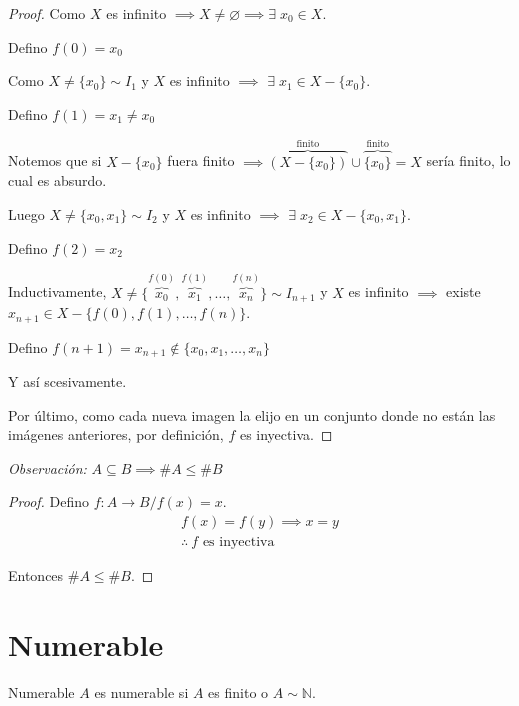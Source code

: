 \begin{proof}\phantom{.}

    Como $X$ es infinito $\implies X \neq \varnothing \implies \exists \;
    x_0 \in X$.

    Defino $f(0) = x_0$

    \medskip
    Como $X \neq \{x_0\} \sim I_1$ y $X$ es infinito $\implies$ 
    $\exists \; x_1 \in X - \{ x_0 \}$. 

    Defino $f(1) = x_1 \neq x_0$

    Notemos que si
    $X - \{ x_0 \}$ fuera finito 
    $\implies \overbrace{(X-\{x_0\})}^{\text{finito}}
    \cup \overbrace{\{ x_0 \}}^{\text{finito}} = X $ sería finito, lo cual
    es absurdo.

    \medskip

    Luego $X \neq \{x_0, x_1\} \sim I_2$ y $X$ es infinito $\implies$ 
    $\exists \; x_2 \in X - \{x_0, x_1\}$. 

    Defino $f(2) = x_2$

    Inductivamente,
    $X \neq \{\overbrace{x_0}^{f(0)}, \overbrace{x_1}^{f(1)}, \dotsc, 
    \overbrace{x_n}^{f(n)}\} 
    \sim I_{n+1}$ y $X$ es infinito $\implies$ existe 
    $x_{n+1} \in X - \{f(0), f(1), \dotsc, f(n)\}$. 

    Defino 
    $f(n+1) = x_{n+1} \notin \{ x_0, x_1, \dotsc, x_n \}$


    Y así scesivamente.


    Por último, como cada nueva imagen la elijo en un conjunto donde no están 
    las imágenes anteriores, por definición, $f$ es inyectiva.

\end{proof}


\bigskip
\textit{Observación:}
$A \subseteq B \implies \# A \leq \# B$


\begin{proof} \phantom{.}

    Defino $f: A \to B / f(x) = x$.
    \begin{gather*}
        f(x) = f(y) \implies x = y \\
        \therefore ~ f \text{ es inyectiva}
    \end{gather*}

    Entonces $\# A \leq \# B$.

\end{proof}

\section{Numerable}
\begin{definicion}{Numerable}{}
    $A$ es numerable si $A$ es finito o $A \sim \mathbb{N}$.
\end{definicion}

